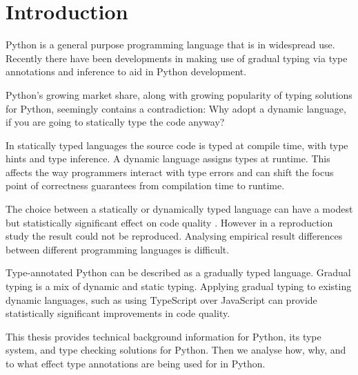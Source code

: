 \chapter{Introduction\label{intro}}

Python is a general purpose programming language that is in widespread use. Recently there have been developments in making use of gradual typing via type annotations and inference to aid in Python development.

Python's growing market share, along with growing popularity of typing solutions for Python, seemingly contains a contradiction: Why adopt a dynamic language, if you are going to statically type the code anyway?

In statically typed languages the source code is typed at compile time, with type hints and type inference. A dynamic language assigns types at runtime. This affects the way programmers interact with type errors and can shift the focus point of correctness guarantees from compilation time to  runtime.

The choice between a statically or dynamically typed language can have a modest but statistically significant effect on code quality \cite{ray_codequality_2014}.
However in a reproduction study \cite{codequality_reproudction_2019} the result could not be reproduced. Analysing empirical result differences between different programming languages is difficult.

Type-annotated Python can be described as a gradually typed language. Gradual typing is a mix of dynamic and static typing. Applying gradual typing to existing dynamic languages, such as using TypeScript over JavaScript can provide statistically significant improvements in code quality. %

This thesis provides technical background information for Python, its type system, and type checking solutions for Python. Then we analyse how, why, and to what effect type annotations are being used for in Python.

